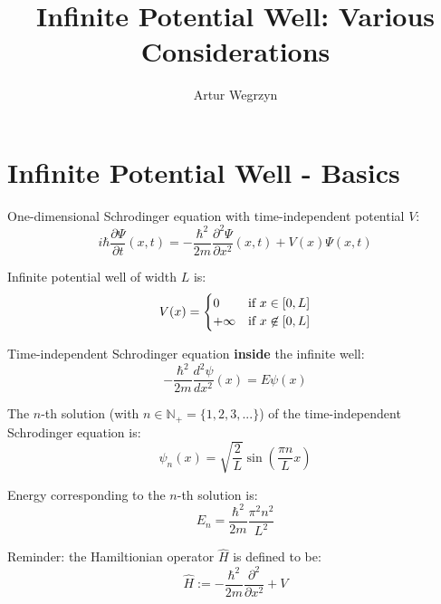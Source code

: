 \documentclass[12pt]{article}
\begin{document}
\title{Infinite Potential Well: Various Considerations}
\author{Artur Wegrzyn}
\maketitle


\tableofcontents

\section{Infinite Potential Well - Basics}
One-dimensional Schrodinger equation with time-independent potential $V$:
\begin{equation}
i \hbar \frac{\partial \Psi}{\partial t}(x,t) = - \frac{\hbar^2}{2m} \frac{\partial^2 \Psi}{\partial x^2}(x,t) + V(x) \Psi(x, t)
\end{equation}

Infinite potential well of width $L$ is:
\begin{equation}
V(x) =
\begin{cases} 
0 & \text{if $ x\in [0, L] $} \\ 
+\infty & \text{if $ x \not\in [0, L] $}
\end{cases}
\end{equation}

Time-independent Schrodinger equation \textbf{inside} the infinite well:
\begin{equation}
- \frac{\hbar^2}{2m} \frac{d^2 \psi}{ d x^2}(x) = E \psi(x)
\end{equation}

The $n$-th solution (with $n \in \mathbb{N}_{+}=\{1, 2, 3, ... \}$) of the time-independent Schrodinger equation is:
\begin{equation}
\psi_n(x) = \sqrt{\frac{2}{L}} \sin \left( \frac{\pi n}{L}x \right)
\end{equation}

\noindent Energy corresponding to the $n$-th solution is:
\begin{equation}
E_n = \frac{\hbar^2}{2m} \frac{\pi^2 n^2}{L^2}
\end{equation}

\noindent Reminder: the Hamiltionian operator $\hat{H}$ is defined to be:
\begin{equation}
\hat{H} := - \frac{\hbar^2}{2m}\frac{\partial^2}{\partial x^2} + V
\end{equation}
\end{document}
